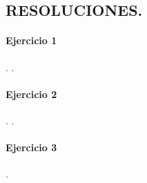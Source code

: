\documentclass{article}
\begin{document}


\begin{center}
\section*{RESOLUCIONES.}
\end{center}
\paragraph{Ejercicio 1}.
.
\paragraph{Ejercicio 2}.
.
\paragraph{Ejercicio 3}.
\end{document}
